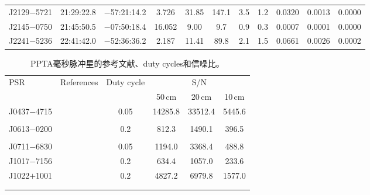 \begin{landscape}
\begin{table}
\begin{center}
\begin{tabular}{lcccccccccc}
J2129$-$5721& 21:29:22.8  &  $-$57:21:14.2 &  3.726  &  31.85    & 147.1    & 3.5       & 1.2    &  0.0320  &  0.0013  &  0.0000  \\ 
J2145$-$0750& 21:45:50.5  &  $-$07:50:18.4 &  16.052 &  9.00     & 9.7      & 0.9       & 0.3    &  0.0007  &  0.0001  &  0.0000  \\ 
J2241$-$5236& 22:41:42.0  &  $-$52:36:36.2 &  2.187  &  11.41    & 89.8     & 2.1       & 1.5    &  0.0661  &  0.0026  &  0.0002  \\ 
%
\hline
\end{tabular}
\end{center}
\end{table}
\end{landscape}


\begin{table}
\centering
\caption{PPTA毫秒脉冲星的参考文献、duty cycles和信噪比。}
\label{ref}
\begin{tabular}{lccccc}
\hline
PSR          &    References                       &  Duty cycle           &    \multicolumn{3}{c}{S/N}                   \\  
             &                                     &                       &    50\,cm    &  20\,cm      &  10\,cm        \\   
\hline
J0437$-$4715 & \cite{Johnston93,Manchester95a}   & 0.05  &    14285.8 	 &   33512.4  	&     5445.6    \\  
             & \cite{Navarro97,Yan11a}             &       &               &              &               \\  
J0613$-$0200 & \cite{Xilouris98,Stairs99}         & 0.2   &      812.3 	 &    1490.1  	&      396.5    \\  
             & \cite{Ord04,Yan11a}                 &       &               &              &               \\  
J0711$-$6830 & \cite{Manchester04,Ord04,Yan11a}    & 0.05  &     1194.0 	 &    3368.4  	&      488.8    \\  
J1017$-$7156 & \cite{Keith12}                     & 0.2   &      634.4 	 &    1057.0  	&      233.6    \\
J1022$+$1001 & \cite{Xilouris98,1022Kramer99}     & 0.2   &     4827.2 	 &    6979.8  	&     1577.0    \\  
             & \cite{Stairs99,Ord04,Yan11a}        &       &               &              &               \\
             &                                    &       &               &              &               \\

\end{tabular}
\end{table}
